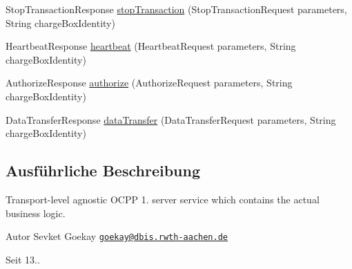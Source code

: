 \begin{DoxyCompactItemize}
\item 
Stop\+Transaction\+Response \hyperlink{classde_1_1rwth_1_1idsg_1_1steve_1_1service_1_1_central_system_service15___service_aa547b40f44cb1db8aea33116facf772e}{stop\+Transaction} (Stop\+Transaction\+Request parameters, String charge\+Box\+Identity)
\item 
Heartbeat\+Response \hyperlink{classde_1_1rwth_1_1idsg_1_1steve_1_1service_1_1_central_system_service15___service_a0ff1bb73a2fc212f929598e1cae54d3c}{heartbeat} (Heartbeat\+Request parameters, String charge\+Box\+Identity)
\item 
Authorize\+Response \hyperlink{classde_1_1rwth_1_1idsg_1_1steve_1_1service_1_1_central_system_service15___service_a8597819f2220a6966a337d7a1d030285}{authorize} (Authorize\+Request parameters, String charge\+Box\+Identity)
\item 
Data\+Transfer\+Response \hyperlink{classde_1_1rwth_1_1idsg_1_1steve_1_1service_1_1_central_system_service15___service_af91f0db063936519a866dd1f6fc80004}{data\+Transfer} (Data\+Transfer\+Request parameters, String charge\+Box\+Identity)
\end{DoxyCompactItemize}


\subsection{Ausführliche Beschreibung}
Transport-\/level agnostic O\+C\+P\+P 1. server service which contains the actual business logic.

\begin{DoxyAuthor}{Autor}
Sevket Goekay \href{mailto:goekay@dbis.rwth-aachen.de}{\tt goekay@dbis.\+rwth-\/aachen.\+de} 
\end{DoxyAuthor}
\begin{DoxySince}{Seit}
13.. 
\end{DoxySince}


